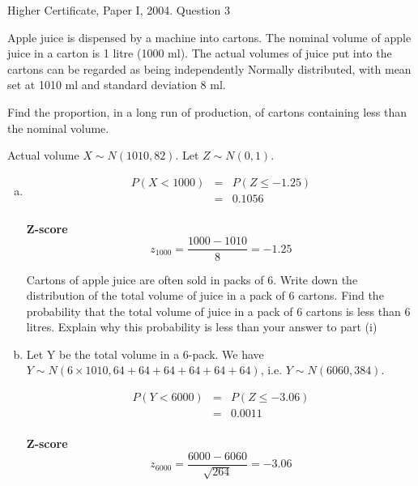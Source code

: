 \documentclass[a4paper,12pt]{article}
\begin{document}
Higher Certificate, Paper I, 2004. Question 3
\begin{framed}
\noindent Apple juice is dispensed by a machine into cartons.  The nominal volume of apple juice in a carton is 1 litre (1000 ml).  The actual volumes of juice put into the cartons can be regarded as being independently Normally distributed, with mean set at 1010 ml and standard deviation 8 ml. 

 
 
Find the proportion, in a long run of production, of cartons containing less than the nominal volume. 
\end{framed} 


Actual volume $X \sim N(1010, 82)$. Let $Z \sim N(0,1)$.
\begin{enumerate}[(a)]
\item 

\begin{eqnarray*}
P(X <  1000) &=& P(Z \leq -1.25) \\
&=& 0.1056\\
\end{eqnarray*}

\begin{framed}
\noindent \textbf{Z-score}\\
\[z_{1000} = \frac{1000-1010}{8} = -1.25\]
\end{framed}
\newpage
\begin{framed}
Cartons of apple juice are often sold in packs of 6.  Write down the distribution of the total volume of juice in a pack of 6 cartons.  Find the probability that the total volume of juice in a pack of 6 cartons is less than 6 litres.  Explain why this probability is less than your answer to part (i)
\end{framed}
\item  Let Y be the total volume in a 6-pack.
We have $Y \sim N(6 × 1010, 64 + 64 + 64 + 64 + 64 + 64)$, i.e. $Y \sim N(6060, 384)$.

\begin{eqnarray*}
P(Y <  6000) &=& P(Z \leq -3.06) \\
&=& 0.0011\\
\end{eqnarray*}
\begin{framed}
\noindent \textbf{Z-score}\\
\[z_{6000} = \frac{6000-6060}{\sqrt{264} } = -3.06\]
\end{framed} 


\end{enumerate}
\end{document}
